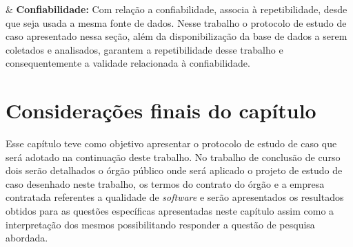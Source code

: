 \begin{easylist}[itemize]
\textcolor{red}{}


& \textbf{Confiabilidade: } Com relação a confiabilidade,  associa à repetibilidade, desde que seja usada a mesma fonte de dados. Nesse trabalho o protocolo de estudo de caso apresentado nessa seção, além da disponibilização da base de dados a serem coletados e analisados, garantem a repetibilidade desse trabalho e consequentemente a validade relacionada à confiabilidade.

\end{easylist}	


\section{Considerações finais do capítulo}

Esse capítulo teve como objetivo apresentar o protocolo de estudo de caso que será adotado na continuação deste trabalho. No trabalho de conclusão de curso dois serão detalhados o órgão público onde será aplicado o projeto de estudo de caso desenhado neste trabalho, os termos do contrato do órgão e a empresa contratada referentes a qualidade de \textit{software} e serão apresentados os resultados obtidos para as questões específicas apresentadas neste capítulo assim como a interpretação dos mesmos possibilitando responder a questão de pesquisa abordada.  